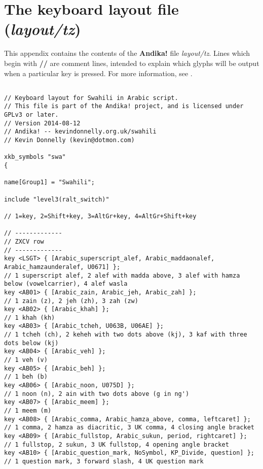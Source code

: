 \chapter{The keyboard layout file (\textit{layout/tz})}
\renewcommand{\thesection}{E/\arabic{section}}  %
\setcounter{section}{0}  %
\label{appE}

This appendix contains the contents of the \textbf{Andika!} file \textit{layout/tz}.  Lines which begin with \textbf{//} are comment lines, intended to explain which glyphs will be output when a particular key is pressed.  For more information, see .

\begin{verbatim}

// Keyboard layout for Swahili in Arabic script.
// This file is part of the Andika! project, and is licensed under GPLv3 or later.
// Version 2014-08-12
// Andika! -- kevindonnelly.org.uk/swahili
// Kevin Donnelly (kevin@dotmon.com)

xkb_symbols "swa"
{

name[Group1] = "Swahili";

include "level3(ralt_switch)"

// 1=key, 2=Shift+key, 3=AltGr+key, 4=AltGr+Shift+key

// -------------
// ZXCV row
// -------------
key <LSGT> { [Arabic_superscript_alef, Arabic_maddaonalef, Arabic_hamzaunderalef, U0671] };
// 1 superscript alef, 2 alef with madda above, 3 alef with hamza below (vowelcarrier), 4 alef wasla
key <AB01> { [Arabic_zain, Arabic_jeh, Arabic_zah] };
// 1 zain (z), 2 jeh (zh), 3 zah (zw)
key <AB02> { [Arabic_khah] };
// 1 khah (kh)
key <AB03> { [Arabic_tcheh, U063B, U06AE] };
// 1 tcheh (ch), 2 keheh with two dots above (kj), 3 kaf with three dots below (kj)
key <AB04> { [Arabic_veh] };
// 1 veh (v)
key <AB05> { [Arabic_beh] };
// 1 beh (b)
key <AB06> { [Arabic_noon, U075D] };
// 1 noon (n), 2 ain with two dots above (g in ng')
key <AB07> { [Arabic_meem] };
// 1 meem (m)
key <AB08> { [Arabic_comma, Arabic_hamza_above, comma, leftcaret] };
// 1 comma, 2 hamza as diacritic, 3 UK comma, 4 closing angle bracket
key <AB09> { [Arabic_fullstop, Arabic_sukun, period, rightcaret] };
// 1 fullstop, 2 sukun, 3 UK fullstop, 4 opening angle bracket
key <AB10> { [Arabic_question_mark, NoSymbol, KP_Divide, question] };
// 1 question mark, 3 forward slash, 4 UK question mark


\end{verbatim}
